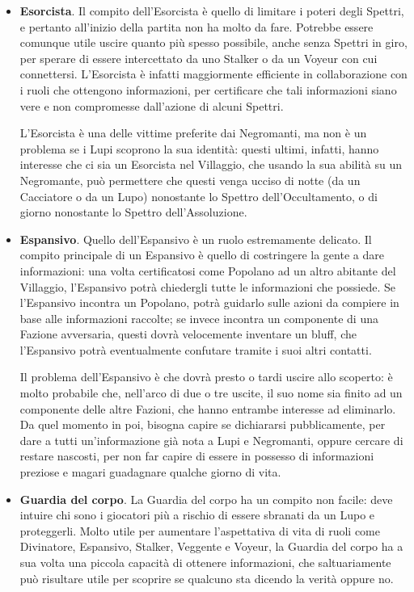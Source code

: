 \documentclass[a4paper,10pt]{article}
\begin{document}
\begin{itemize}
	\item {\bf Esorcista}. Il compito dell'Esorcista è quello di limitare i poteri degli Spettri, e pertanto all'inizio della partita non ha molto da fare. Potrebbe essere comunque utile uscire quanto più spesso possibile, anche senza Spettri in giro, per sperare di essere intercettato da uno Stalker o da un Voyeur con cui connettersi. L'Esorcista è infatti maggiormente efficiente in collaborazione con i ruoli che ottengono informazioni, per certificare che tali informazioni siano vere e non compromesse dall'azione di alcuni Spettri.
	
	L'Esorcista è una delle vittime preferite dai Negromanti, ma non è un problema se i Lupi scoprono la sua identità: questi ultimi, infatti, hanno interesse che ci sia un Esorcista nel Villaggio, che usando la sua abilità su un Negromante, può permettere che questi venga ucciso di notte (da un Cacciatore o da un Lupo) nonostante lo Spettro dell'Occultamento, o di giorno nonostante lo Spettro dell'Assoluzione.
	
	\item {\bf Espansivo}. Quello dell'Espansivo è un ruolo estremamente delicato. Il compito principale di un Espansivo è quello di costringere la gente a dare informazioni: una volta certificatosi come Popolano ad un altro abitante del Villaggio, l'Espansivo potrà chiedergli tutte le informazioni che possiede. Se l'Espansivo incontra un Popolano, potrà guidarlo sulle azioni da compiere in base alle informazioni raccolte; se invece incontra un componente di una Fazione avversaria, questi dovrà velocemente inventare un bluff, che l'Espansivo potrà eventualmente confutare tramite i suoi altri contatti.
	
	Il problema dell'Espansivo è che dovrà presto o tardi uscire allo scoperto: è molto probabile che, nell'arco di due o tre uscite, il suo nome sia finito ad un componente delle altre Fazioni, che hanno entrambe interesse ad eliminarlo. Da quel momento in poi, bisogna capire se dichiararsi pubblicamente, per dare a tutti un'informazione già nota a Lupi e Negromanti, oppure cercare di restare nascosti, per non far capire di essere in possesso di informazioni preziose e magari guadagnare qualche giorno di vita.
	
	\item {\bf Guardia del corpo}. La Guardia del corpo ha un compito non facile: deve intuire chi sono i giocatori più a rischio di essere sbranati da un Lupo e proteggerli. Molto utile per aumentare l'aspettativa di vita di ruoli come Divinatore, Espansivo, Stalker, Veggente e Voyeur, la Guardia del corpo ha a sua volta una piccola capacità di ottenere informazioni, che saltuariamente può risultare utile per scoprire se qualcuno sta dicendo la verità oppure no.
	

\end{itemize}
\end{document}
